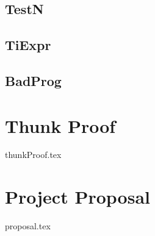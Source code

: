 \documentclass[12pt,a4paper,twoside,openright]{book}
\numberwithin{subcase}{case}
\begin{document}
\section*{TestN}

\section*{TiExpr}

\section*{BadProg}


\label{appendix:programs}

\chapter{Thunk Proof}

{thunkProof.tex}

\label{appendix:thunkProof}

\chapter{Project Proposal}

{proposal.tex}

\label{appendix:proposal}
\end{document}
